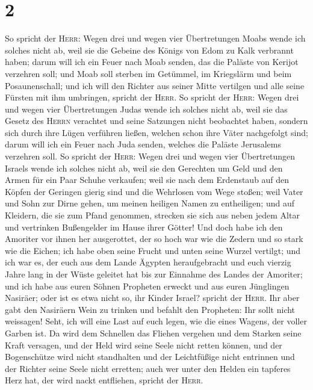 \hypertarget{section-1}{%
\section{2}\label{section-1}}

 So spricht der \textsc{Herr}: Wegen drei und wegen vier
Übertretungen Moabs wende ich solches nicht ab, weil sie die Gebeine des
Königs von Edom zu Kalk verbrannt haben;  darum will ich
ein Feuer nach Moab senden, das die Paläste von Kerijot verzehren soll;
und Moab soll sterben im Getümmel, im Kriegslärm und beim
Posaunenschall;  und ich will den Richter aus seiner Mitte
vertilgen und alle seine Fürsten mit ihm umbringen, spricht der
\textsc{Herr}.  So spricht der \textsc{Herr}: Wegen drei
und wegen vier Übertretungen Judas wende ich solches nicht ab, weil sie
das Gesetz des \textsc{Herrn} verachtet und seine Satzungen nicht
beobachtet haben, sondern sich durch ihre Lügen verführen ließen,
welchen schon ihre Väter nachgefolgt sind;  darum will ich
ein Feuer nach Juda senden, welches die Paläste Jerusalems verzehren
soll.  So spricht der \textsc{Herr}: Wegen drei und wegen
vier Übertretungen Israels wende ich solches nicht ab, weil sie den
Gerechten um Geld und den Armen für ein Paar Schuhe verkaufen;
 weil sie nach dem Erdenstaub auf den Köpfen der Geringen
gierig sind und die Wehrlosen vom Wege stoßen; weil Vater und Sohn zur
Dirne gehen, um meinen heiligen Namen zu entheiligen;  und
auf Kleidern, die sie zum Pfand genommen, strecken sie sich aus neben
jedem Altar und vertrinken Bußengelder im Hause ihrer Götter!
 Und doch habe ich den Amoriter vor ihnen her ausgerottet,
der so hoch war wie die Zedern und so stark wie die Eichen; ich habe
oben seine Frucht und unten seine Wurzel vertilgt;  und
ich war es, der euch aus dem Lande Ägypten heraufgebracht und euch
vierzig Jahre lang in der Wüste geleitet hat bis zur Einnahme des Landes
der Amoriter;  und ich habe aus euren Söhnen Propheten
erweckt und aus euren Jünglingen Nasiräer; oder ist es etwa nicht so,
ihr Kinder Israel? spricht der \textsc{Herr}.  Ihr aber
gabt den Nasiräern Wein zu trinken und befahlt den Propheten: Ihr sollt
nicht weissagen!  Seht, ich will eine Last auf euch
legen, wie die eines Wagens, der voller Garben ist.  Da
wird dem Schnellen das Fliehen vergehen und dem Starken seine Kraft
versagen, und der Held wird seine Seele nicht retten können,
 und der Bogenschütze wird nicht standhalten und der
Leichtfüßige nicht entrinnen und der Richter seine Seele nicht erretten;
 auch wer unter den Helden ein tapferes Herz hat, der
wird nackt entfliehen, spricht der \textsc{Herr}.


